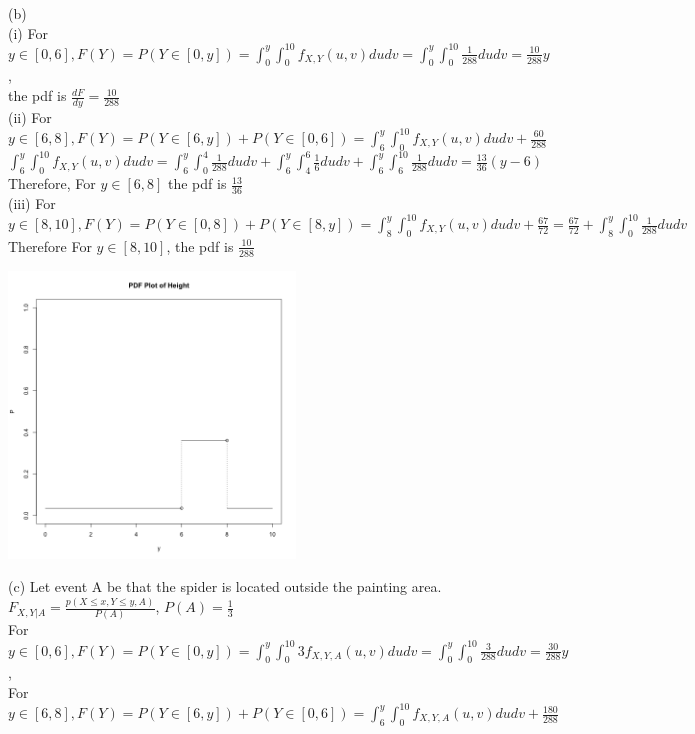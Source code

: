 \documentclass[11pt]{article}
\begin{document}
(b)\\
 (i) For $y \in [0,6], F(Y) = P(Y \in [0,y]) = \int_{0}^{y} \int_{0}^{10}  f_{X,Y}{(u,v)} du dv =  \int_{0}^{y} \int_{0}^{10}  \frac{1}{288}dudv = \frac{10}{288} y$,\\
the pdf is $\frac{dF}{dy} = \frac{10}{288} $\\
(ii) For $y \in [6,8],F(Y) = P(Y \in [6,y])+P(Y\in [0,6]) = \int_{6}^{y} \int_{0}^{10}  f_{X,Y}{(u,v)} du dv + \frac{60}{288}$\\
$  \int_{6}^{y} \int_{0}^{10}  f_{X,Y}{(u,v)} du dv =  \int_{6}^{y} \int_{0}^{4} \frac{1}{288} du dv + \int_{6}^{y} \int_{4}^{6} \frac{1}{6} du dv +\int_{6}^{y} \int_{6}^{10} \frac{1}{288} du dv = \frac{13}{36}(y-6) $\\
Therefore, For $y \in [6,8]$ the pdf is $\frac{13}{36}$\\
(iii) For $y \in [8,10], F(Y) = P(Y \in [0,8])+ P(Y \in [8,y]) = \int_{8}^{y} \int_{0}^{10}  f_{X,Y}{(u,v)} du dv + \frac{67}{72}=  \frac{67}{72} +\int_{8}^{y} \int_{0}^{10}  \frac{1}{288}dudv $\\
Therefore For $y \in [8,10]$, the pdf is $\frac{10}{288}$\\
\begin{center}
\includegraphics[height= 3in]{Q1_pdf.png}\\
\end{center}
(c) Let event A be that the spider is located outside the painting area.\\
 $F_{X,Y|A} = \frac{p(X\leq x,Y\leq y,A)}{P(A)}$, $P(A) = \frac{1}{3}$\\
For $y \in [0,6], F(Y) = P(Y \in [0,y]) = \int_{0}^{y} \int_{0}^{10}  3f_{X,Y,A}{(u,v)} du dv =  \int_{0}^{y} \int_{0}^{10}  \frac{3}{288}dudv = \frac{30}{288} y$,\\
For $y \in [6,8],F(Y) = P(Y \in [6,y])+P(Y\in [0,6]) = \int_{6}^{y} \int_{0}^{10}  f_{X,Y,A}{(u,v)} du dv + \frac{180}{288}$\\
\end{document}
